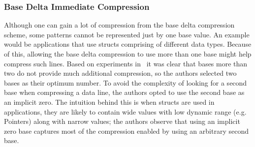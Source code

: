 \subsubsection{Base Delta Immediate Compression}
Although one can gain a lot of compression from the base delta compression scheme, some patterns cannot be represented just by one base value. An example would be applications that use structs comprising of different data types. Because of this, allowing the base delta compression to use more than one base might help compress such lines. Based on experiments in~\cite{bdi} it was clear that bases more than two do not provide much additional compression, so the authors selected two bases as their optimum number. To avoid the complexity of looking for a second base when compressing a data line, the authors opted to use the second base as an implicit zero. The intuition behind this is when structs are used in applications, they are likely to contain wide values with low dynamic range (e.g. Pointers) along with narrow values; the authors observe that using an implicit zero base captures most of the compression enabled by using an arbitrary second base.
